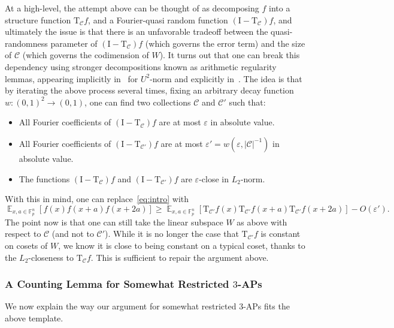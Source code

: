 \documentclass[11pt]{article}
\newcommand\card[1]{\left| {#1} \right|}
\newcommand\Expect[2]{{\mathop{\mathbb{E}}_{#1}\left[ {#2} \right]}}
\newcommand\eps{\varepsilon}
\renewcommand\geq{\geqslant}
\begin{document}
At a high-level, the attempt above can be thought of as decomposing $f$ into a structure function $\mathrm{T}_{\mathcal{C}} f$, and a Fourier-quasi random function 
$(\mathrm{I}-\mathrm{T}_{\mathcal{C}}) f$, and ultimately the issue is that there is an unfavorable tradeoff between the quasi-randomness parameter of $(\mathrm{I}-\mathrm{T}_{\mathcal{C}}) f$ (which governs the error term) and the size of $\mathcal{C}$ (which governs the codimension of $W$). It turns out that one can break this dependency using stronger decompositions known as arithmetic regularity lemmas, appearing implicitly in~\cite{bourgain1986szemeredi} for $U^2$-norm and explicitly in~\cite{Green2005SzemerediRegularityAbelianGroups,GreenTao2010ArithmeticRegularity}. The idea is that by iterating the above process several times, fixing an arbitrary decay function $w\colon (0,1)^2\to (0,1)$, one can find two collections $\mathcal{C}$ and $\mathcal{C}'$ such that:
\begin{itemize}
    \item All Fourier coefficients of 
    $(\mathrm{I}-\mathrm{T}_{\mathcal{C}}) f$ are at most $\eps$ in absolute value.
    \item All Fourier coefficients of $(\mathrm{I}-\mathrm{T}_{\mathcal{C}'}) f$ are at most $\eps'=w(\eps,\card{\mathcal{C}}^{-1})$ in absolute value.
    \item The functions 
    $(\mathrm{I}-\mathrm{T}_{\mathcal{C}}) f$ and 
    $(\mathrm{I}-\mathrm{T}_{\mathcal{C}'}) f$ are $\eps$-close in $L_2$-norm.
\end{itemize}
With this in mind, one can replace~\eqref{eq:intro} with 
\begin{equation}\label{eq:intro_2}
\Expect{x,a\in\mathbb{F}_p^n}{f(x)f(x+a)f(x+2a)}
\geq
\Expect{x,a\in\mathbb{F}_p^n}{\mathrm{T}_{\mathcal{C}'}f(x)\mathrm{T}_{\mathcal{C}'}f(x+a)\mathrm{T}_{\mathcal{C}'}f(x+2a)}
-O(\eps').
\end{equation}
The point now is that one can still take the linear subspace $W$ as above with respect to $\mathcal{C}$ (and not to $\mathcal{C}'$). While it is no longer the case that $\mathrm{T}_{\mathcal{C}'}f$ is constant on cosets of $W$, we know it is close to being constant on a typical coset, thanks to the $L_2$-closeness to  $\mathrm{T}_{\mathcal{C}}f$. This is sufficient to repair the argument above.

\subsubsection{A Counting Lemma for Somewhat Restricted \texorpdfstring{$3$}{3}-APs}
We now explain the way our argument for somewhat restricted $3$-APs fits the above template. 
\end{document}
